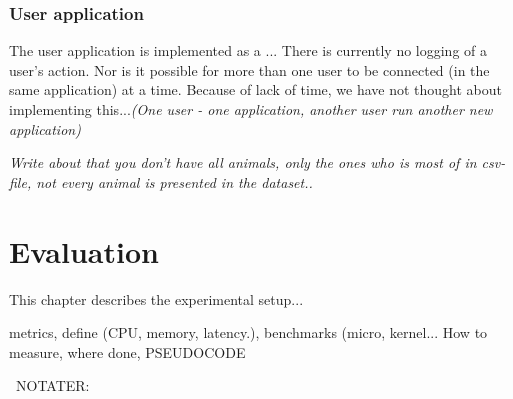 \documentclass[USenglish]{uit-thesis}
\begin{document}
\subsection{User application} \label{sssec:user}
The user application is implemented as a ...
There is currently no logging of a user's action. Nor is it possible for more than one user to be connected (in the same application) at a time. Because of lack of time, we have not thought about implementing this...\textit{(One user - one application, another user run another new application)}

\textit{Write about that you don't have all animals, only the ones who is most of in csv-file, not every animal is presented in the dataset..}



\chapter{Evaluation} 
This chapter describes the experimental setup...

metrics, define (CPU, memory, latency.), benchmarks (micro, kernel...
How to measure, where done, PSEUDOCODE

\ NOTATER:
\end{document}
